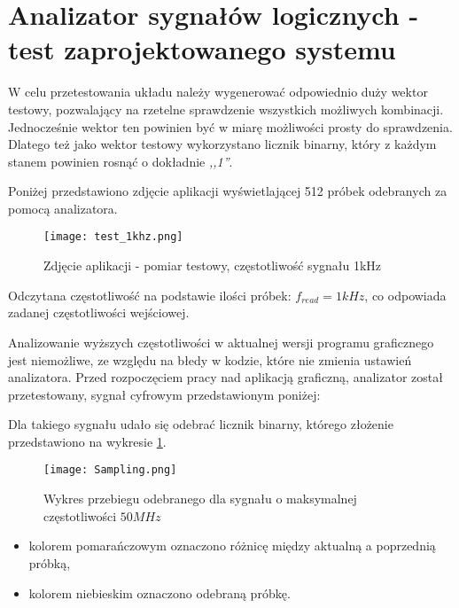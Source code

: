 \section{Analizator sygnałów logicznych - test zaprojektowanego systemu}
    W celu przetestowania układu należy wygenerować odpowiednio duży wektor testowy,
    pozwalający na rzetelne sprawdzenie wszystkich możliwych kombinacji.
    Jednocześnie wektor ten powinien być w miarę możliwości prosty do sprawdzenia.
    Dlatego też jako wektor testowy wykorzystano licznik binarny, który z każdym stanem powinien rosnąć o dokładnie \textit{,,1''}.

    Poniżej przedstawiono zdjęcie aplikacji wyświetlającej 512 próbek odebranych za pomocą analizatora.
    \begin{figure}[!ht]
        \centering
        \texttt{[image: test\_1khz.png]}
        \caption{Zdjęcie aplikacji - pomiar testowy, częstotliwość sygnału 1kHz}
    \end{figure}

    Odczytana częstotliwość na podstawie ilości próbek: $f_{read} = 1kHz$, co odpowiada zadanej częstotliwości wejściowej.

    Analizowanie wyższych częstotliwości w aktualnej wersji programu graficznego jest niemożliwe, ze względu na błedy w kodzie, które nie zmienia ustawień analizatora.
    Przed rozpoczęciem pracy nad aplikacją graficzną, analizator został przetestowany, sygnał cyfrowym przedstawionym poniżej:
    \begin{figure}[!ht]
        \centering
    \end{figure}

    Dla takiego sygnału udało się odebrać licznik binarny, którego złożenie przedstawiono na wykresie \ref{fig:sampling}.
    \newpage
    \begin{figure}[!ht]
        \centering
        \texttt{[image: Sampling.png]}
        \caption{Wykres przebiegu odebranego dla sygnału o maksymalnej częstotliwości $50MHz$}
        \label{fig:sampling}
    \end{figure}
    \begin{itemize}
        \item kolorem pomarańczowym oznaczono różnicę między aktualną a poprzednią próbką,
        \item kolorem niebieskim oznaczono odebraną próbkę.
    \end{itemize}

